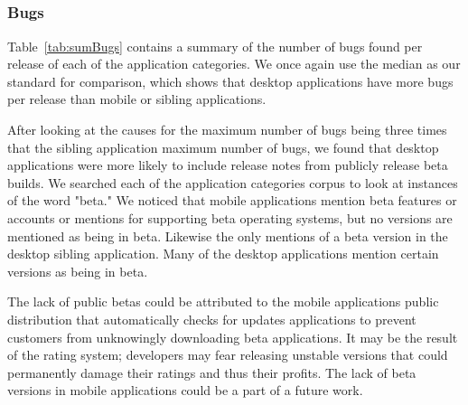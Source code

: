 \documentclass{acm_proc_article-sp}
\begin{document}
\begin{center}

\label{tab:sumcycles}
\end{center}

\begin{center}

\label{tab:cycles}
\end{center}


\subsection{\RQThree }



\subsubsection{Bugs}

\begin{center}

\label{tab:sumBugs}
\end{center}

\begin{center}

\label{tab:bugs}
\end{center}

Table~\ref{tab:sumBugs} contains a summary of the number of bugs found per release of each of the application categories. 
We once again use the median as our standard for comparison, which shows that desktop applications have more bugs per release than mobile or sibling applications. 

After looking at the causes for the maximum number of bugs being three times that the sibling application maximum number of bugs, we found that desktop applications were more likely to include release notes from publicly release beta builds. 
We searched each of the application categories corpus to look at instances of the word "beta."
We noticed that mobile applications mention beta features or accounts or mentions for supporting beta operating systems, but no versions are mentioned as being in beta. 
Likewise the only mentions of a beta version in the desktop sibling application.
Many of the desktop applications mention certain versions as being in beta.

The lack of public betas could be attributed to the mobile applications public distribution that automatically checks for updates applications to prevent customers from unknowingly downloading beta applications. 
It may be the result of the rating system; developers may fear releasing unstable versions that could permanently damage their ratings and thus their profits. 
The lack of beta versions in mobile applications could be a part of a future work.
\end{document}
